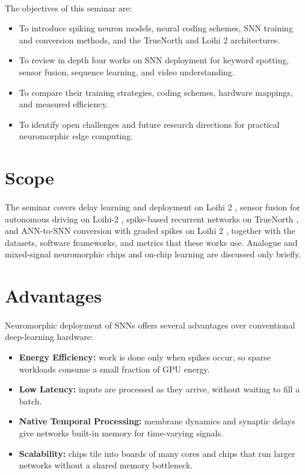 \documentclass[12pt,a4paper,final]{extreport}
\begin{document}
\paragraph{} The objectives of this seminar are:
\begin{itemize}
  \item To introduce spiking neuron models, neural coding schemes, SNN training and conversion methods, and the TrueNorth and Loihi 2 architectures.
  \item To review in depth four works on SNN deployment for keyword spotting, sensor fusion, sequence learning, and video understanding.
  \item To compare their training strategies, coding schemes, hardware mappings, and measured efficiency.
  \item To identify open challenges and future research directions for practical neuromorphic edge computing.
\end{itemize}

\section{Scope}

\paragraph{} The seminar covers delay learning and deployment on Loihi 2 \cite{p1}, sensor fusion for autonomous driving on Loihi-2 \cite{p2}, spike-based recurrent networks on TrueNorth \cite{p3}, and ANN-to-SNN conversion with graded spikes on Loihi 2 \cite{p4}, together with the datasets, software frameworks, and metrics that these works use. Analogue and mixed-signal neuromorphic chips and on-chip learning are discussed only briefly.

\section{Advantages}

\paragraph{} Neuromorphic deployment of SNNs offers several advantages over conventional deep-learning hardware:
\begin{itemize}
  \item \textbf{Energy Efficiency:} work is done only when spikes occur, so sparse workloads consume a small fraction of GPU energy.
  \item \textbf{Low Latency:} inputs are processed as they arrive, without waiting to fill a batch.
  \item \textbf{Native Temporal Processing:} membrane dynamics and synaptic delays give networks built-in memory for time-varying signals.
  \item \textbf{Scalability:} chips tile into boards of many cores and chips that run larger networks without a shared memory bottleneck.
\end{itemize}
\end{document}
